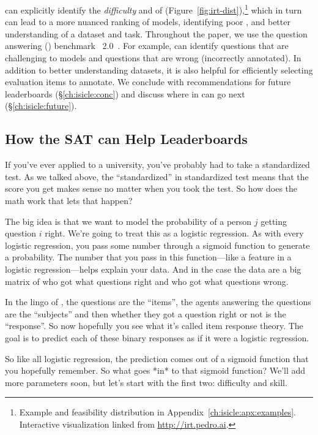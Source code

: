 \name{} can explicitly identify the \emph{difficulty} and
  \emph{\discability{}} of \itms{} (Figure~\ref{fig:irt-dist}),\footnote{
  Example and feasibility distribution in
  Appendix~\ref{ch:isicle:apx:examples}.  Interactive visualization linked
  from \href{https://irt.pedro.ai}{http://irt.pedro.ai}.  } which in turn can
  lead to a more nuanced ranking of models, identifying poor \itms{}, and
  better understanding of a dataset and task.  Throughout the paper, we use
  the question answering (\qa{}) benchmark
  \squad{}~2.0~\citep{rajpurkar2018know}.  For example, \name{} can identify
  questions that are challenging to models and questions that are wrong
  (incorrectly annotated).  In addition to better understanding datasets, it
  is also helpful for efficiently selecting evaluation items to annotate.  We
  conclude with recommendations for future leaderboards
  (\S\ref{ch:isicle:conc}) and discuss where \irt{} in \nlp{} can go next
  (\S\ref{ch:isicle:future}).

\subsection{How the SAT can Help Leaderboards}

If you’ve ever applied to a university, you’ve probably had to take a
standardized test.  As we talked above, the ``standardized'' in standardized
test means that the score you get makes sense no matter when you took the
test.  So how does the math work that lets that happen?

The big idea is that we want to model the probability of a person $j$ getting
question $i$ right.  We’re going to treat this as a logistic regression.  As
with every logistic regression, you pass some number through a sigmoid
function to generate a probability.  The number that you pass in this
function—like a feature in a logistic regression—helps explain your data. And
in the case the data are a big matrix of who got what questions right and who
got what questions wrong.

In the lingo of , the questions are the ``items'', the agents answering
the questions are the ``subjects'' and then whether they got a question right or
not is the ``response''.  So now hopefully you see what it’s called item
response theory.  The goal is to predict each of these binary responses as if
it were a logistic regression.

So like all logistic regression, the prediction comes out of a sigmoid
function that you hopefully remember.  So what goes *in* to that sigmoid
function?  We’ll add more parameters soon, but let’s start with the first two:
difficulty and skill.

